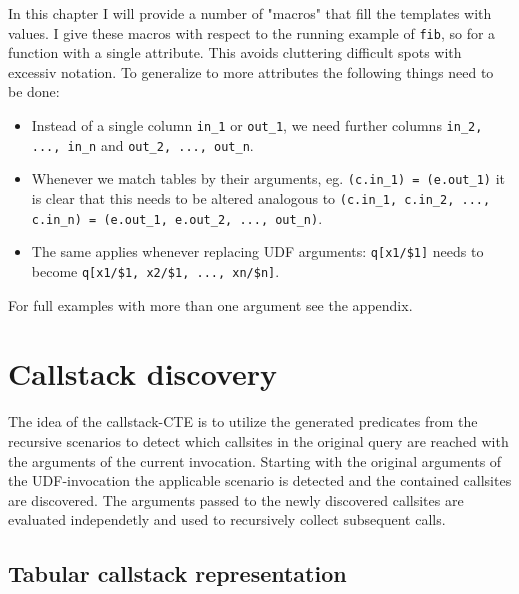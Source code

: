 In this chapter I will provide a number of "macros" that fill the templates with values. I give these macros with respect to the running example of \texttt{fib}, so for a function with a single attribute. This avoids cluttering difficult spots with excessiv notation. To generalize to more attributes the following things need to be done:
\begin{itemize}
    \item Instead of a single column \texttt{in\_1} or \texttt{out\_1}, we need further columns \texttt{in\_2, ..., in\_n} and \texttt{out\_2, ..., out\_n}.
    \item Whenever we match tables by their arguments, eg. \texttt{(c.in\_1) = (e.out\_1)} it is clear that this needs to be altered analogous to \texttt{(c.in\_1, c.in\_2, ..., c.in\_n) = (e.out\_1, e.out\_2, ..., out\_n)}.
    \item The same applies whenever replacing UDF arguments: \texttt{q[x1/\$1]} needs to become \texttt{q[x1/\$1, x2/\$1, ..., xn/\$n]}.
\end{itemize}
For full examples with more than one argument see the appendix. 

\section{Callstack discovery}

The idea of the callstack-CTE is to utilize the generated predicates from the recursive scenarios to detect which callsites in the original query are reached with the arguments of the current invocation.
Starting with the original arguments of the UDF-invocation the applicable scenario is detected and the contained callsites are discovered. The arguments passed to the newly discovered callsites are evaluated independetly and used to recursively collect subsequent calls.

\subsection{Tabular callstack representation}

